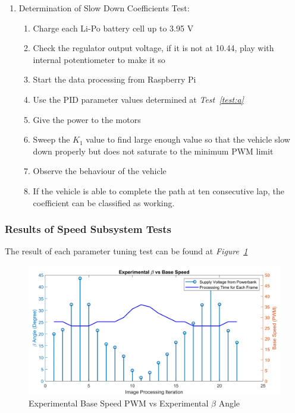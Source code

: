 \documentclass[a4paper,12pt]{article}
\begin{document}
\begin{enumerate}
	\item Determination of Slow Down Coefficients Test: \label{test:a2}		
	\begin{enumerate}
		\item Charge each Li-Po battery cell  up to 3.95 V
		\item Check the regulator output voltage, if it is not at 10.44, play with internal potentiometer to make it so  
		\item Start the data processing from Raspberry Pi
		\item Use the PID parameter values determined at \textit{Test~\ref{test:a}}
		\item Give the power to the motors  
		\item Sweep the $K_1$ value to find large enough value so that the vehicle slow down properly but does not saturate to the minimum PWM limit
		\item Observe the behaviour of the vehicle  
		\item If the vehicle is able to complete the path at ten consecutive lap, the coefficient can be classified as working.  
	\end{enumerate}
	
\end{enumerate}
	
	\subsubsection*{Results of Speed Subsystem Tests}
	
	The result of each parameter tuning test can be found at \textit{Figure~\ref{fig:baseSpeedExp}}
	
	\begin{figure}[h]
		\includegraphics[width=.8\textwidth,center]{images/ROT_ROI/baseSpeedExp_crop}
		\caption{Experimental Base Speed PWM vs Experimental $\beta$ Angle}\label{fig:baseSpeedExp}
	\end{figure}
	
\end{document}
